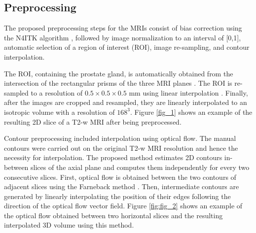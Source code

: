 \subsection{Preprocessing}
\label{subsec:prepro}
The proposed preprocessing steps for the MRIs consist of bias correction using the N4ITK algorithm \cite{n4itk}, followed by image normalization to an interval of [0,1], automatic selection of a region of interest (ROI), image re-sampling, and contour interpolation.  

The ROI, containing the prostate gland, is automatically obtained from the intersection of the rectangular prisms of the three MRI planes \cite{anneke}. The ROI is re-sampled to a resolution of $0.5 \times 0.5 \times 0.5$ mm  using linear interpolation \cite{itk}. Finally, after the images are cropped and resampled, they are linearly interpolated to an isotropic volume with a resolution of $168^3$. Figure \ref{fig_1} shows an example of the resulting 2D slice of a T2-w MRI after being preprocessed.

Contour preprocessing included interpolation using optical flow.  The manual contours were carried out on the original T2-w MRI resolution and hence the necessity for interpolation. The proposed method estimates 2D contours in-between slices of the axial plane and computes them independently for every two consecutive slices. First, optical flow is obtained between the two contours of adjacent slices using the Farneback method \cite{optflow}. Then, intermediate contours are generated by linearly interpolating the position of their edges following the direction of the optical flow vector field. Figure \ref{fig:fig_2} shows an example of the optical flow obtained between two horizontal slices and the resulting interpolated 3D volume using this method. 

